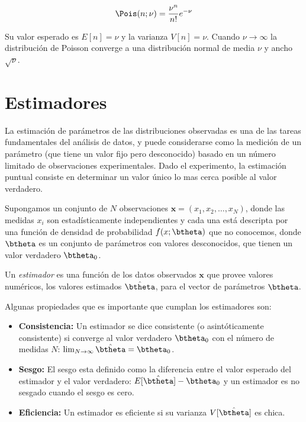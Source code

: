 \begin{equation}
  \Pois(n;\nu) = \frac{\nu^n}{n!} e^{-\nu}
\end{equation}

Su valor esperado es $E[n] = \nu$ y la varianza $V[n] = \nu$.
Cuando $\nu \to \infty$ la distribución de Poisson converge a una distribución
normal de media $\nu$ y ancho $\sqrt{\nu}$.


\section{Estimadores}

La estimación de parámetros de las distribuciones observadas es una de las
tareas fundamentales del análisis de datos, y puede considerarse como la
medición de un parámetro (que tiene un valor fijo pero desconocido)
basado en un número limitado de observaciones experimentales. Dado el
experimento, la estimación puntual consiste en determinar un valor único lo mas
cerca posible al valor verdadero.%

Supongamos un conjunto de $N$ observaciones $\bm{x} = (x_1, x_2, \ldots, x_N)$,
donde las medidas $x_i$ son estadísticamente independientes y cada una está
descripta por una función de densidad de probabilidad $f(x;\btheta)$ que no
conocemos, donde $\btheta$ es un conjunto de parámetros con valores
desconocidos, que tienen un valor verdadero $\btheta_0$.


Un \emph{estimador} es una función de los datos observados $\bm{x}$ que provee
valores numéricos, los valores estimados $\hat{\btheta}$, para el vector de
parámetros $\btheta$.

Algunas propiedades que es importante que cumplan los estimadores son:

\begin{itemize}\itemsep0.2cm\parskip0.2cm
\item[] {\bf Consistencia:} Un estimador se dice consistente (o asintóticamente
  consistente) si converge al valor verdadero $\btheta_{0}$ con el número de
  medidas $N$: $\lim_{N \to \infty} \hat{\btheta} = \btheta_0$.

\item[] {\bf Sesgo:} El sesgo esta definido como la diferencia entre el valor
  esperado del estimador y el valor verdadero: $E[\hat{\btheta}] - \btheta_0$ y
  un estimador es no sesgado cuando el sesgo es cero.

\item[] {\bf Eficiencia:} Un estimador es eficiente si su varianza $V[\hat{\btheta}]$ es chica.
\end{itemize}

